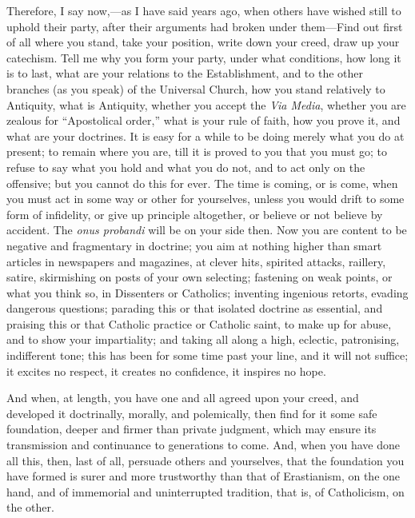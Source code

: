 Therefore, I say now,—as I have said years ago, when others have
wished still to uphold their party, after their arguments had broken
under them—Find out first of all where you stand, take your
position, write down your creed, draw up your catechism. Tell me why
you form your party, under what conditions, how long it is to last,
what are your relations to the Establishment, and to the other
branches (as you speak) of the Universal Church, how you stand
relatively to Antiquity, what is Antiquity, whether you accept the \emph{Via
Media}, whether you are zealous for ``Apostolical order,''
what is your rule of faith, how you prove it, and what are your
doctrines. It is easy for a while to be doing merely what you do at
present; to remain where you are, till it is proved to you that you
must go; to refuse to say what you hold and what you do not, and to
act only on the offensive; but you cannot do this for ever. The time
is coming, or is come, when you must act in some way or other for
yourselves, unless you would drift to some form of infidelity, or give
up principle altogether, or believe or not believe by accident. The \emph{onus
probandi} will be on your side then. Now you are content to be
negative and fragmentary in doctrine; you aim at nothing higher than
smart articles in newspapers and magazines, at clever hits, spirited
attacks, raillery, satire, skirmishing on posts of your own selecting;
fastening on weak points, or what you think so, in Dissenters or
Catholics; inventing ingenious retorts, evading dangerous questions;
parading this or that isolated doctrine as essential, and praising
this or that Catholic practice or Catholic saint, to make up for
abuse, and to show your impartiality; and taking all along a high,
eclectic, patronising, indifferent tone; this has been for some time
past your line, and it will not suffice; it excites no respect, it
creates no confidence, it inspires no hope.

And when, at length, you have one and all agreed upon your creed,
and developed it doctrinally, morally, and polemically, then find for
it some safe foundation, deeper and firmer than private judgment,
which may ensure its transmission and continuance to generations to
come. And, when you have done all this, then, last of all, persuade
others and yourselves, that the foundation you have formed is surer
and more trustworthy than that of Erastianism, on the one hand, and of
immemorial and uninterrupted tradition, that is, of Catholicism, on
the other.


